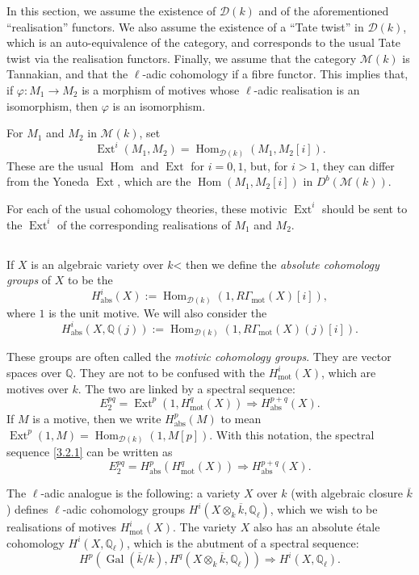 \documentclass{article}
\theoremstyle{plain}
\theoremstyle{definition}
\newcommand{\sh}{\mathscr}
\newcommand{\QQ}{\mathbb{Q}}
\newcommand{\mot}{\mathrm{mot}}
\newcommand{\abs}{\mathrm{abs}}
\DeclareMathOperator{\Hom}{Hom}
\DeclareMathOperator{\Ext}{Ext}
\DeclareMathOperator{\Gal}{Gal}
\newcommand{\oldpage}[1]{\marginpar{\footnotesize$\Big\vert$ \textit{p.~#1}}}
\begin{document}
In this section, we assume the existence of $\sh{D}(k)$ and of the aforementioned ``realisation'' functors.
We also assume the existence of a ``Tate twist'' in $\sh{D}(k)$, which is an auto-equivalence of the category, and corresponds to the usual Tate twist via the realisation functors.
Finally, we assume that the category $\sh{M}(k)$ is Tannakian, and that the $\ell$-adic cohomology if a fibre functor.
This implies that, if $\varphi\colon M_1\to M_2$ is a morphism of motives whose $\ell$-adic realisation is an isomorphism, then $\varphi$ is an isomorphism.

For $M_1$ and $M_2$ in $\sh{M}(k)$, set
\[
  \Ext^i(M_1,M_2) = \Hom_{\sh{D}(k)}(M_1,M_2[i]).
\]
\oldpage{155}
These are the usual $\Hom$ and $\Ext$ for $i=0,1$, but, for $i>1$, they can differ from the Yoneda $\Ext$, which are the $\Hom(M_1,M_2[i])$ in $D^b(\sh{M}(k))$.

For each of the usual cohomology theories, these motivic $\Ext^i$ should be sent to the $\Ext^i$ of the corresponding realisations of $M_1$ and $M_2$.


\subsection{}
\label{3.2}

If $X$ is an algebraic variety over $k$< then we define the \emph{absolute cohomology groups} of $X$ to be the
\[
  H^i_\abs(X) := \Hom_{\sh{D}(k)}(1,R\Gamma_\mot(X)[i]),
\]
where $1$ is the unit motive.
We will also consider the
\[
  H^i_\abs(X,\QQ(j)) := \Hom_{\sh{D}(k)}(1,R\Gamma_\mot(X)(j)[i]).
\]

These groups are often called the \emph{motivic cohomology groups}.
They are vector spaces over $\QQ$.
They are not to be confused with the $H^i_\mot(X)$, which are motives over $k$.
The two are linked by a spectral sequence:
\[
\label{3.2.1}
  E_2^{pq} = \Ext^p(1,H_\mot^q(X)) \Rightarrow H_\abs^{p+q}(X).
\tag{3.2.1}
\]
If $M$ is a motive, then we write $H^p_\abs(M)$ to mean $\Ext^p(1,M)=\Hom_{\sh{D}(k)}(1,M[p])$.
With this notation, the spectral sequence \cref{3.2.1} can be written as
\[
\label{3.2.2}
  E_2^{pq} = H_\abs^p(H_\mot^q(X)) \Rightarrow H_\abs^{p+q}(X).
\tag{3.2.2}
\]

The $\ell$-adic analogue is the following:
a variety $X$ over $k$ (with algebraic closure $\overline{k}$) defines $\ell$-adic cohomology groups $H^i(X\otimes_k\overline{k},\QQ_\ell)$, which we wish to be realisations of motives $H_\mot^i(X)$.
The variety $X$ also has an absolute \'{e}tale cohomology $H^i(X,\QQ_\ell)$, which is the abutment of a spectral sequence:
\[
  H^p(\Gal(\overline{k}/k), H^q(X\otimes_k\overline{k},\QQ_\ell)) \Rightarrow H^i(X,\QQ_\ell).
\]
\end{document}

